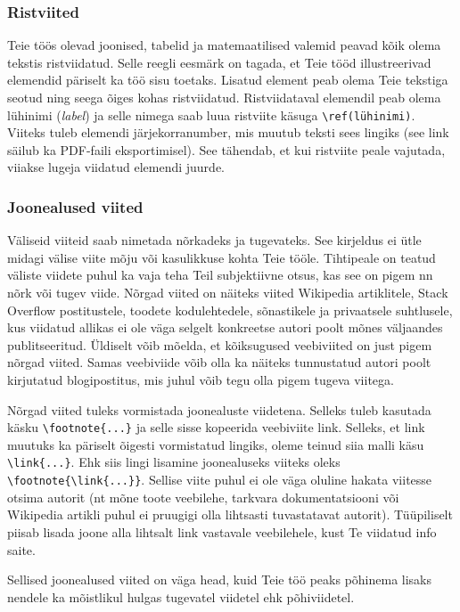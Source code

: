 \subsubsection{Ristviited}
Teie töös olevad joonised, tabelid ja matemaatilised valemid peavad kõik olema tekstis ristviidatud. Selle reegli eesmärk on tagada, et Teie tööd illustreerivad elemendid päriselt ka töö sisu toetaks. Lisatud element peab olema Teie tekstiga seotud ning seega õiges kohas ristviidatud. Ristviidataval elemendil peab olema lühinimi (\emph{label}) ja selle nimega saab luua ristviite käsuga \verb|\ref(lühinimi)|. Viiteks tuleb elemendi järjekorranumber, mis muutub teksti sees lingiks (see link säilub ka PDF-faili eksportimisel). See tähendab, et kui ristviite peale vajutada, viiakse lugeja viidatud elemendi juurde.

\subsubsection{Joonealused viited}
Väliseid viiteid saab nimetada nõrkadeks ja tugevateks. See kirjeldus ei ütle midagi välise viite mõju või kasulikkuse kohta Teie tööle. Tihtipeale on teatud väliste viidete puhul ka vaja teha Teil subjektiivne otsus, kas see on pigem nn nõrk või tugev viide. Nõrgad viited on näiteks viited Wikipedia artiklitele, Stack Overflow postitustele, toodete kodulehtedele, sõnastikele ja privaatsele suhtlusele, kus viidatud allikas ei ole väga selgelt konkreetse autori poolt mõnes väljaandes publitseeritud. Üldiselt võib mõelda, et kõiksugused veebiviited on just pigem nõrgad viited. Samas veebiviide võib olla ka näiteks tunnustatud autori poolt kirjutatud blogipostitus, mis juhul võib tegu olla pigem tugeva viitega.

Nõrgad viited tuleks vormistada joonealuste viidetena. Selleks tuleb kasutada käsku \verb|\footnote{...}| ja selle sisse kopeerida veebiviite link. Selleks, et link muutuks ka päriselt õigesti vormistatud lingiks, oleme teinud siia malli käsu \verb|\link{...}|. Ehk siis lingi lisamine joonealuseks viiteks oleks \verb|\footnote{\link{...}}|. Sellise viite puhul ei ole väga oluline hakata viitesse otsima autorit (nt mõne toote veebilehe, tarkvara dokumentatsiooni või Wikipedia artikli puhul ei pruugigi olla lihtsasti tuvastatavat autorit). Tüüpiliselt piisab lisada joone alla lihtsalt link vastavale veebilehele, kust Te viidatud info saite.

Sellised joonealused viited on väga head, kuid Teie töö peaks põhinema lisaks nendele ka mõistlikul hulgas tugevatel viidetel ehk põhiviidetel.

